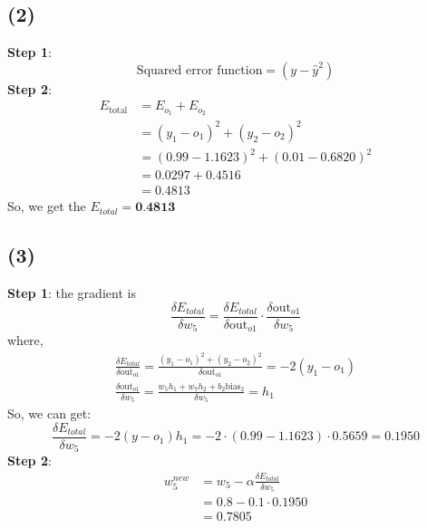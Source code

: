 \documentclass[onecolumn,oneside]{SUSTechHomework}
\begin{document}
    \subsection*{(2)}
    \textbf{Step 1}: 
    \[\text{Squared error function} = (y-\hat{y}^2)\]
    \textbf{Step 2}:
    \[
        \begin{split}
            E_{\text{total}} &= E_{o_1} + E_{o_2} \\
            &= (y_1 - o_1)^2 + (y_2 - o_2)^2 \\
            &= (0.99 - 1.1623)^2 + (0.01 - 0.6820)^2 \\
            &= 0.0297 + 0.4516 \\
            &= 0.4813
        \end{split}
    \]
    So, we get the \(E_{total} = \textbf{0.4813}\)

    \subsection*{(3)}
    \textbf{Step 1}:
    the gradient is 
    \[
        \frac{\delta E_{total}}{\delta w_5} = \frac{\delta E_{total}}{\delta \text{out}_{o1}} \cdot \frac{\delta \text{out}_{o1}}{\delta w_5}
    \]
    where, 
    \[
        \begin{split}
        \frac{\delta E_{total}}{\delta \text{out}_{o1}} = \frac{(y_1 - o_1)^2 + (y_2 - o_2)^2}{\delta \text{out}_{o1}} = -2(y_1 - o_1) \\
        \frac{\delta \text{out}_{o1}}{\delta w_5} = \frac{w_5h_1+w_7h_2+b_2\text{bias}_2}{\delta w_5} = h_1
    \end{split}
    \]
    So, we can get:
    \[
        \frac{\delta E_{total}}{\delta w_5} = -2(y-o_1)h_1 = -2\cdot(0.99 - 1.1623)\cdot0.5659 = 0.1950
    \]
    \textbf{Step 2}:
    \[
    \begin{split}
        w_5^{new} &= w_5 - \alpha \frac{\delta E_{total}}{\delta w_5} \\
        &= 0.8 - 0.1\cdot 0.1950\\
        &= 0.7805
    \end{split}
    \]
\end{document}
